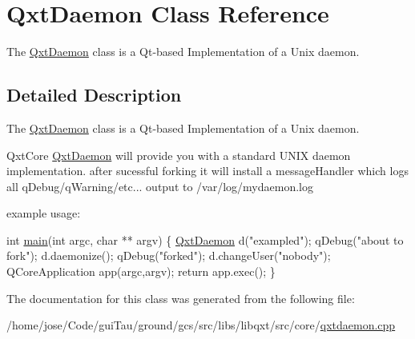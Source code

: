 \hypertarget{class_qxt_daemon}{\section{Qxt\-Daemon Class Reference}
\label{class_qxt_daemon}
}


The \hyperlink{class_qxt_daemon}{Qxt\-Daemon} class is a Qt-\/based Implementation of a Unix daemon.  




\subsection{Detailed Description}
The \hyperlink{class_qxt_daemon}{Qxt\-Daemon} class is a Qt-\/based Implementation of a Unix daemon. 

Qxt\-Core \hyperlink{class_qxt_daemon}{Qxt\-Daemon} will provide you with a standard U\-N\-I\-X daemon implementation. after sucessful forking it will install a message\-Handler which logs all q\-Debug/q\-Warning/etc... output to /var/log/mydaemon.log

example usage\-: 
\begin{DoxyCode}
\textcolor{keywordtype}{int} \hyperlink{gcs_2src_2app_2main_8cpp_a3c04138a5bfe5d72780bb7e82a18e627}{main}(\textcolor{keywordtype}{int} argc, \textcolor{keywordtype}{char} ** argv)
    \{
    \hyperlink{class_qxt_daemon}{QxtDaemon} d(\textcolor{stringliteral}{"exampled"});
    qDebug(\textcolor{stringliteral}{"about to fork"});
    d.daemonize();
    qDebug(\textcolor{stringliteral}{"forked"});
    d.changeUser(\textcolor{stringliteral}{"nobody"});
    QCoreApplication app(argc,argv);
    \textcolor{keywordflow}{return} app.exec();
    \}
\end{DoxyCode}
 

The documentation for this class was generated from the following file\-:\begin{DoxyCompactItemize}
\item 
/home/jose/\-Code/gui\-Tau/ground/gcs/src/libs/libqxt/src/core/\hyperlink{qxtdaemon_8cpp}{qxtdaemon.\-cpp}\end{DoxyCompactItemize}
